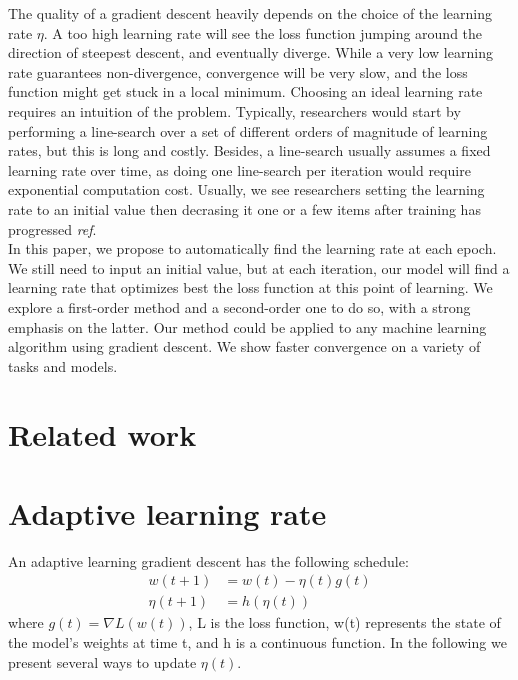 \documentclass{article}
\begin{document}
  The quality of a gradient descent heavily depends on the choice of the learning rate $\eta$. A too high learning rate will see the loss function jumping around the direction of steepest descent, and eventually diverge. While a very low learning rate guarantees non-divergence, convergence will be very slow, and the loss function might get stuck in a local minimum. Choosing an ideal learning rate requires an intuition of the problem. Typically, researchers would start by performing a line-search over a set of different orders of magnitude of learning rates, but this is long and costly. Besides, a line-search usually assumes a fixed learning rate over time, as doing one line-search per iteration would require exponential computation cost. Usually, we see researchers setting the learning rate to an initial value then decrasing it one or a few items after training has progressed \emph{ref}.\\
  
  In this paper, we propose to automatically find the learning rate at each epoch. We still need to input an initial value, but at each iteration, our model will find a learning rate that optimizes best the loss function at this point of learning. We explore a first-order method and a second-order one to do so, with a strong emphasis on the latter. Our method could be applied to any machine learning algorithm using gradient descent. We show faster convergence on a variety of tasks and models. \\ 
  
  \section{Related work}
  
  \section{Adaptive learning rate}
  
  An adaptive learning gradient descent has the following schedule:\\
  \begin{align}
  w(t+1) &= w(t) -\eta(t)g(t)\\
  \eta(t+1) &= h(\eta(t))
  \end{align}
  where $g(t) = \nabla L(w(t))$, L is the loss function, w(t) represents the state of the model's weights at time t, and h is a continuous function. In the following we present several ways to update $\eta(t)$.
  
\end{document}
